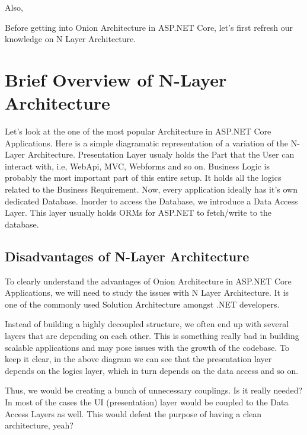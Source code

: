 \documentclass[letterpaper,10pt,english]{sphinxmanual}
\begin{document}
Also, 

Before getting into Onion Architecture in ASP.NET Core, let’s first refresh our knowledge on N Layer Architecture.


\chapter{Brief Overview of N-Layer Architecture}
\label{\detokenize{OnionArchitecture/details:brief-overview-of-n-layer-architecture}}
Let’s look at the one of the most popular Architecture in ASP.NET Core Applications. Here is a simple diagramatic representation of a variation of the N-Layer Architecture. Presentation Layer usualy holds the Part that the User can interact with, i.e, WebApi, MVC, Webforms and so on. Business Logic is probably the most important part of this entire setup. It holds all the logics related to the Business Requirement. Now, every application ideally has it’s own dedicated Database. Inorder to access the Database, we introduce a Data Access Layer. This layer usually holds ORMs for ASP.NET to fetch/write to the database.

\noindent{}


\section{Disadvantages of N-Layer Architecture}
\label{\detokenize{OnionArchitecture/details:disadvantages-of-n-layer-architecture}}
To clearly understand the advantages of Onion Architecture in ASP.NET Core Applications, we will need to study the issues with N Layer Architecture. It is one of the commonly used Solution Architecture amongst .NET developers.

Instead of building a highly decoupled structure, we often end up with several layers that are depending on each other. This is something really bad in building scalable applications and may pose issues with the growth of the codebase. To keep it clear, in the above diagram we can see that the presentation layer depends on the logics layer, which in turn depends on the data access and so on.

Thus, we would be creating a bunch of unnecessary couplings. Is it really needed? In most of the cases the UI (presentation) layer would be coupled to the Data Access Layers as well. This would defeat the purpose of having a clean architecture, yeah?
\end{document}
